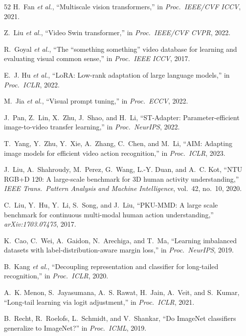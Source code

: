 \documentclass[journal]{IEEEtran}
\begin{document}
\begin{thebibliography}{52}
 H.~Fan \emph{et al.}, ``Multiscale vision
transformers,'' in \emph{Proc.\ IEEE/CVF ICCV}, 2021.

 Z.~Liu \emph{et al.}, ``Video Swin
transformer,'' in \emph{Proc.\ IEEE/CVF CVPR}, 2022.

 R.~Goyal \emph{et al.}, ``The
``something something'' video database for learning and evaluating visual
common sense,'' in \emph{Proc.\ IEEE ICCV}, 2017.

 E.~J. Hu \emph{et al.}, ``LoRA: Low-rank adaptation of
large language models,'' in \emph{Proc.\ ICLR}, 2022.

 M.~Jia \emph{et al.}, ``Visual prompt tuning,'' in
\emph{Proc.\ ECCV}, 2022.

 J.~Pan, Z.~Lin, X.~Zhu, J.~Shao, and H.~Li,
``ST-Adapter: Parameter-efficient image-to-video transfer learning,'' in
\emph{Proc.\ NeurIPS}, 2022.

 T.~Yang, Y.~Zhu, Y.~Xie, A.~Zhang, C.~Chen, and
M.~Li, ``AIM: Adapting image models for efficient video action
recognition,'' in \emph{Proc.\ ICLR}, 2023.

 J.~Liu, A.~Shahroudy, M.~Perez, G.~Wang, L.-Y.
Duan, and A.~C. Kot, ``NTU RGB+D 120: A large-scale benchmark for 3D human
activity understanding,'' \emph{IEEE Trans.\ Pattern Analysis and Machine
Intelligence}, vol.~42, no.~10, 2020.

 C.~Liu, Y.~Hu, Y.~Li, S.~Song, and J.~Liu,
``PKU-MMD: A large scale benchmark for continuous multi-modal human action
understanding,'' \emph{arXiv:1703.07475}, 2017.

 K.~Cao, C.~Wei, A.~Gaidon, N.~Arechiga, and T.~Ma,
``Learning imbalanced datasets with label-distribution-aware margin loss,''
in \emph{Proc.\ NeurIPS}, 2019.

 B.~Kang \emph{et al.}, ``Decoupling
representation and classifier for long-tailed recognition,'' in
\emph{Proc.\ ICLR}, 2020.

 A.~K. Menon, S.~Jayasumana, A.~S. Rawat, H.~Jain,
A.~Veit, and S.~Kumar, ``Long-tail learning via logit adjustment,'' in
\emph{Proc.\ ICLR}, 2021.

 B.~Recht, R.~Roelofs, L.~Schmidt, and
V.~Shankar, ``Do ImageNet classifiers generalize to ImageNet?'' in
\emph{Proc.\ ICML}, 2019.


\end{thebibliography}
\end{document}
